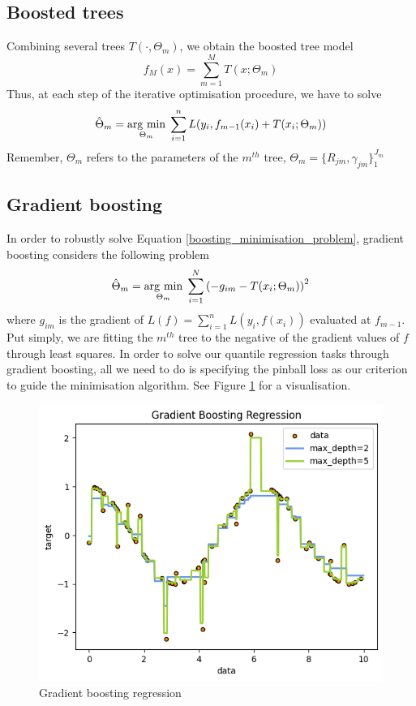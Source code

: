 \subsection{Boosted trees}
Combining several trees $T(\cdot, \Theta_m)$, we obtain the boosted tree model
\begin{equation}
    f_M(x)=\sum\limits_{m=1}^M T(x;\Theta_m)
\end{equation}
Thus, at each step of the iterative optimisation procedure, we have to solve
\begin{equation}\label{boosting_minimisation_problem}
    \hat{\Theta}_m=\underset{\Theta_m}{\operatorname{arg}\,\operatorname{min}}\;\sum\limits_{i=1}^{n}L(y_i, f_{m-1}(x_i)+T(x_i;\Theta_m))
\end{equation}
Remember, $\Theta_m$ refers to the parameters of the $m^{th}$ tree, $\Theta_m=\{R_{jm}, \gamma_{jm}\}_1^{J_m}$
\subsection{Gradient boosting}
In order to robustly solve Equation \ref{boosting_minimisation_problem}, gradient boosting considers the following problem
\begin{equation}
    \hat{\Theta}_m=\underset{\Theta_m}{\operatorname{arg}\,\operatorname{min}}\;\sum\limits_{i=1}^{N}\left(-g_{im}-T(x_i;\Theta_m)\right)^2
\end{equation}
where $g_{im}$ is the gradient of $L(f)=\sum\limits_{i=1}^n L(y_i, f(x_i))$ evaluated at $f_{m-1}$. Put simply, we are fitting the $m^{th}$ tree to the negative of the gradient values of $f$ through least squares.
In order to solve our quantile regression tasks through gradient boosting, all we need to do is specifying the pinball loss as our criterion to guide the minimisation algorithm. See Figure \ref{fig:gradient_boosting} for a visualisation.
\begin{figure}
    \includegraphics[width=\textwidth]{images/gradient_boosting.png}
    \caption{Gradient boosting regression}
    \label{fig:gradient_boosting}
\end{figure}



